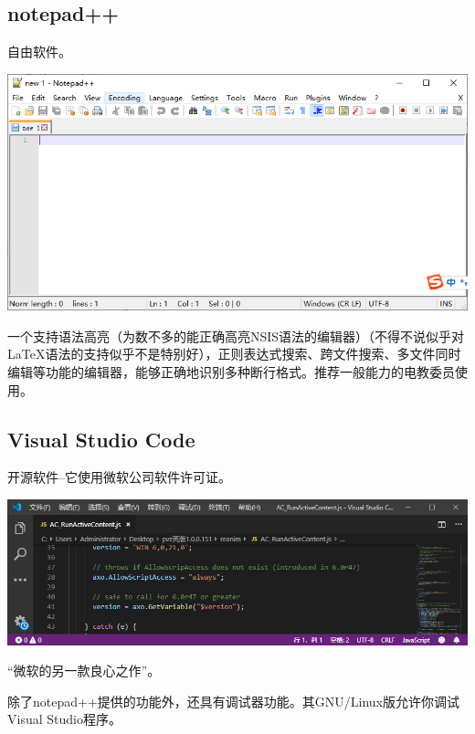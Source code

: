 \subsection{notepad++}
自由软件。
\begin{center}
	\includegraphics[scale=0.9]{pic/npp.png}
\end{center} \par
一个支持语法高亮（为数不多的能正确高亮NSIS语法的编辑器）（不得不说似乎对\LaTeX 语法的支持似乎不是特别好），正则表达式搜索、跨文件搜索、多文件同时编辑等功能的编辑器，能够正确地识别多种断行格式。推荐一般能力的电教委员使用。
\subsection{Visual Studio Code}
开源软件--它使用微软公司软件许可证。
\begin{center}
	\includegraphics[scale=0.7]{pic/vscode.PNG}
\end{center} \par
“微软的另一款良心之作”。\par
除了notepad++提供的功能外，还具有调试器功能。其GNU/Linux版允许你调试Visual Studio程序。
